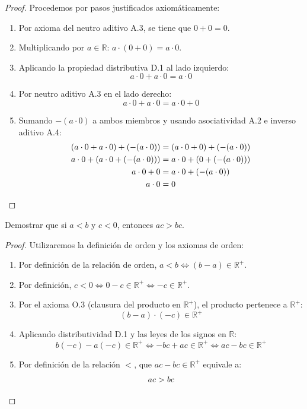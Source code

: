 \begin{proof}
Procedemos por pasos justificados axiomáticamente:
\begin{enumerate}
    \item Por axioma del neutro aditivo A.3, se tiene que $0 + 0 = 0$.
    \item Multiplicando por $a \in \mathbb{R}$: $a \cdot (0 + 0) = a \cdot 0$.
    \item Aplicando la propiedad distributiva D.1 al lado izquierdo:
    \[
    a \cdot 0 + a \cdot 0 = a \cdot 0
    \]
    \item Por neutro aditivo A.3 en el lado derecho:
    \[
    a \cdot 0 + a \cdot 0 = a \cdot 0 + 0
    \]
    \item Sumando $-(a \cdot 0)$ a ambos miembros y usando asociatividad A.2 e inverso aditivo A.4:
    \begin{align*}
        (a \cdot 0 + a \cdot 0) + (-(a \cdot 0)) &= (a \cdot 0 + 0) + (-(a \cdot 0)) \\
        a \cdot 0 + (a \cdot 0 + (-(a \cdot 0))) &= a \cdot 0 + (0 + (-(a \cdot 0))) \\
        a \cdot 0 + 0 &= a \cdot 0 + (-(a \cdot 0)) \\
        a \cdot 0 &= 0 \qedhere
    \end{align*}
\end{enumerate}
\end{proof}

\begin{ejemplo}
Demostrar que si $a < b$ y $c < 0$, entonces $ac > bc$.
\end{ejemplo}

\begin{proof}
Utilizaremos la definición de orden y los axiomas de orden:
\begin{enumerate}
    \item Por definición de la relación de orden, $a < b \iff (b - a) \in \mathbb{R}^+$.
    \item Por definición, $c < 0 \iff 0 - c \in \mathbb{R}^+ \iff -c \in \mathbb{R}^+$.
    \item Por el axioma O.3 (clausura del producto en $\mathbb{R}^+$), el producto pertenece a $\mathbb{R}^+$:
    \[
    (b - a) \cdot (-c) \in \mathbb{R}^+
    \]
    \item Aplicando distributividad D.1 y las leyes de los signos en $\mathbb{R}$:
    \[
    b(-c) - a(-c) \in \mathbb{R}^+ \iff -bc + ac \in \mathbb{R}^+ \iff ac - bc \in \mathbb{R}^+
    \]
    \item Por definición de la relación $<$, que $ac - bc \in \mathbb{R}^+$ equivale a:
    \[
    ac > bc \qedhere
    \]
\end{enumerate}
\end{proof}

